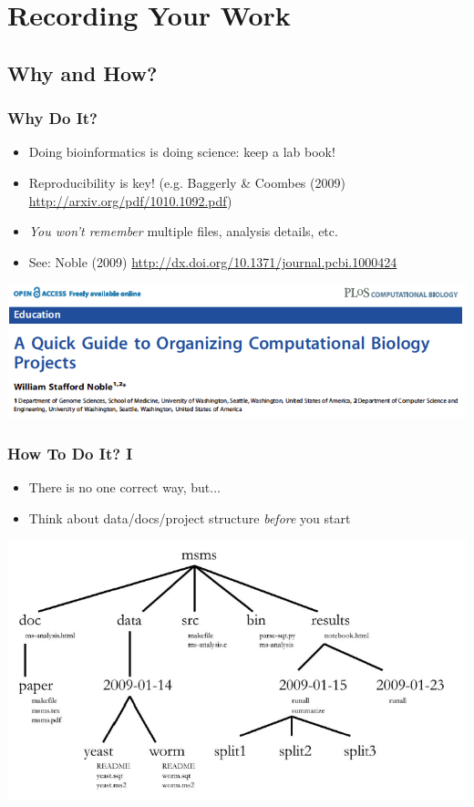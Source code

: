 \documentclass[table]{beamer}
\begin{document}
   \section{Recording Your Work}
   
   \subsection{Why and How?}
   \begin{frame}
     \frametitle{Why Do It?}
     \begin{itemize}
	   \item Doing bioinformatics is doing science: keep a lab book!
	   \item Reproducibility is key! (e.g. Baggerly \& Coombes (2009) \url{http://arxiv.org/pdf/1010.1092.pdf})
	   \item \textit{You won't remember} multiple files, analysis details, etc.
	   \item See: Noble (2009) \url{http://dx.doi.org/10.1371/journal.pcbi.1000424}
	\end{itemize}
	\includegraphics[width=.7\textwidth]{images/noble_2009_head}
   \end{frame}
   
   \begin{frame}
     \frametitle{How To Do It? I}
     \begin{itemize}
	   \item There is no one correct way, but$\ldots$
	   \item Think about data/docs/project structure \textit{before} you start
	\end{itemize}
    \includegraphics[width=.7\textwidth]{images/project_structure}
   \end{frame}
\end{document}
